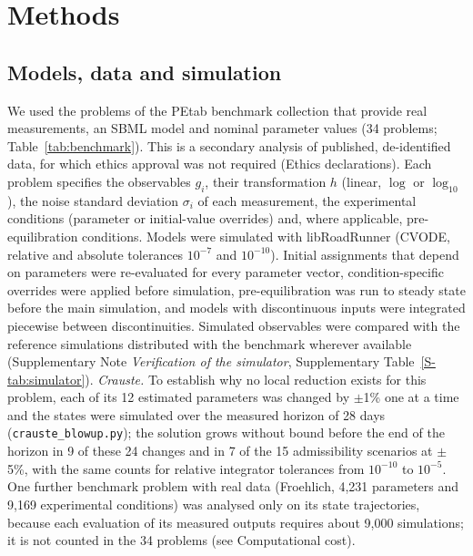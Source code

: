 \documentclass[pdflatex,sn-nature]{sn-jnl}
\theoremstyle{plain}
\begin{document}
\section*{Methods}\label{sec:methods}

\subsection*{Models, data and simulation}\label{met:models}

We used the problems of the PEtab benchmark collection\cite{bib31,bib27} that provide real measurements, an SBML model and nominal parameter values (34 problems; Table~\ref{tab:benchmark}). This is a secondary analysis of published, de-identified data, for which ethics approval was not required (Ethics declarations). Each problem specifies the observables $g_i$, their transformation $h$ (linear, $\log$ or $\log_{10}$), the noise standard deviation $\sigma_i$ of each measurement, the experimental conditions (parameter or initial-value overrides) and, where applicable, pre-equilibration conditions. Models were simulated with libRoadRunner\cite{bib32} (CVODE, relative and absolute tolerances $10^{-7}$ and $10^{-10}$). Initial assignments that depend on parameters were re-evaluated for every parameter vector, condition-specific overrides were applied before simulation, pre-equilibration was run to steady state before the main simulation, and models with discontinuous inputs were integrated piecewise between discontinuities. Simulated observables were compared with the reference simulations distributed with the benchmark wherever available (Supplementary Note \textit{Verification of the simulator}, Supplementary Table~\ref{S-tab:simulator}). \label{met:crauste}\emph{Crauste.} To establish why no local reduction exists for this problem, each of its 12 estimated parameters was changed by $\pm$1\% one at a time and the states were simulated over the measured horizon of 28 days (\texttt{crauste\_blowup.py}); the solution grows without bound before the end of the horizon in 9 of these 24 changes and in 7 of the 15 admissibility scenarios at $\pm$5\%, with the same counts for relative integrator tolerances from $10^{-10}$ to $10^{-5}$. One further benchmark problem with real data (Froehlich, 4,231 parameters and 9,169 experimental conditions) was analysed only on its state trajectories, because each evaluation of its measured outputs requires about 9,000 simulations; it is not counted in the 34 problems (see Computational cost).
\end{document}
